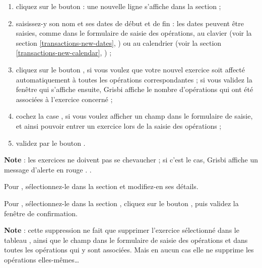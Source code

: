 \begin{enumerate}
	\item cliquez sur le bouton  : une nouvelle ligne  s'affiche dans la section  ;
	\item saisissez-y son nom et ses dates de début et de fin : les dates peuvent être saisies, comme dans le formulaire de saisie des opérations, au clavier (voir la section \vref{transactions-new-dates}, ) ou au calendrier (voir la section \vref{transactions-new-calendar}, ) ;
	\item cliquez sur le bouton , si vous voulez que votre nouvel exercice soit affecté automatiquement à toutes les opérations correspondantes ; si vous validez la fenêtre qui s'affiche ensuite, Grisbi affiche le nombre d'opérations qui ont été associées à l'exercice concerné ;
	\item cochez la case , si vous voulez afficher un champ   dans le formulaire de saisie, et ainsi pouvoir entrer un exercice lors de la saisie des opérations ;
	\item validez par le bouton .
\end{enumerate}

\textbf{Note} : les exercices ne doivent pas se chevaucher ; si c'est le cas, Grisbi affiche un message d'alerte en rouge{\couleur} \ifIllustration {}.
\else .
\fi

Pour , sélectionnez-le dans la section  et modifiez-en ses détails.

Pour , sélectionnez-le dans la section , cliquez sur le bouton , puis validez la fenêtre de confirmation. 

\textbf{Note} : cette suppression ne fait que supprimer l'exercice sélectionné dans le tableau , ainsi que le champ  dans le formulaire de saisie des opérations et dans toutes les opérations qui y sont associées. Mais en aucun cas elle ne supprime les opérations elles-mêmes\ldots


